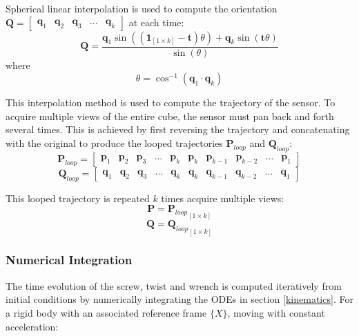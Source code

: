 Spherical linear interpolation is used to compute the orientation
$\mathbf{Q}= \begin{bmatrix}
	\mathbf{q}_1 & \mathbf{q}_2 & \mathbf{q}_3 & \dots & \mathbf{q}_k
\end{bmatrix}$
at each time:
\begin{equation} \label{slerp}
	\mathbf{Q} = \frac{\mathbf{q}_1\sin((\mathbf{1}_{[1 \times k]}-\mathbf{t})\theta) + \mathbf{q}_k\sin(\mathbf{t}\theta)}{\sin(\theta)}
\end{equation}
where
\begin{equation}
	\theta = \cos^{-1}(\mathbf{q}_1 \cdot \mathbf{q}_k)
\end{equation}

This interpolation method is used to compute the trajectory of the sensor. To acquire multiple views of the  entire cube, the sensor must pan back and forth several times. This is achieved by first reversing the trajectory and concatenating with the original to produce the looped trajectories $\mathbf{P}_{loop}$ and $\mathbf{Q}_{loop}$:
\begin{equation}
	\mathbf{P}_{loop}= 
	\begin{bmatrix}
		\mathbf{p}_1 & \mathbf{p}_2 & \mathbf{p}_3 & \dots & \mathbf{p}_k &
		\mathbf{p}_{k} & \mathbf{p}_{k-1} & \mathbf{p}_{k-2} & \dots & \mathbf{p}_1
	\end{bmatrix}
\end{equation}
\begin{equation}
	\mathbf{Q}_{loop}= 
	\begin{bmatrix}
		\mathbf{q}_1 & \mathbf{q}_2 & \mathbf{q}_3 & \dots & \mathbf{q}_k &
		\mathbf{q}_{k} & \mathbf{q}_{k-1} & \mathbf{q}_{k-2} & \dots & \mathbf{q}_1
	\end{bmatrix}
\end{equation}

This looped trajectory is repeated $k$ times acquire multiple views:
\begin{equation}
	\mathbf{P} = {\mathbf{P}_{loop}}_{[1 \times k]}
\end{equation}
\begin{equation}
	\mathbf{Q} = {\mathbf{Q}_{loop}}_{[1 \times k]}
\end{equation}


\subsubsection{Numerical Integration} \label{integration}
The time evolution of the screw, twist and wrench is computed iteratively from initial conditions by numerically integrating the ODEs in section \ref{kinematics}. For a rigid body with an associated reference frame $\{X\}$, moving with constant acceleration:

